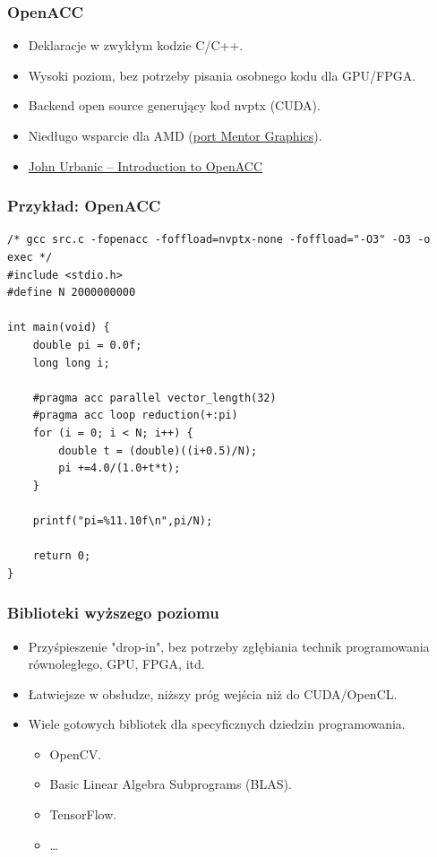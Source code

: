\documentclass[dvipsnames,table]{beamer}
\begin{document}
\begin{frame}
	\frametitle{OpenACC}
\begin{itemize}
	\item Deklaracje w zwykłym kodzie C/C++.
	\item Wysoki poziom, bez potrzeby pisania osobnego kodu dla GPU/FPGA.
	\item Backend open source generujący kod nvptx (CUDA).
	\item Niedługo wsparcie dla AMD (\href{https://gcc.gnu.org/ml/gcc/2018-05/msg00071.html}{port Mentor Graphics}).
	\item \href{https://www.psc.edu/images/xsedetraining/OpenACC_Mar2016/OpenACC_Introduction_To_OpenACC.PDF}{John Urbanic -- Introduction to OpenACC}
\end{itemize}
\end{frame}



\begin{frame}[fragile]
	\frametitle{Przykład: OpenACC}
\begin{lstlisting}
/* gcc src.c -fopenacc -foffload=nvptx-none -foffload="-O3" -O3 -o exec */
#include <stdio.h>
#define N 2000000000

int main(void) {
	double pi = 0.0f;
	long long i;

	#pragma acc parallel vector_length(32)
	#pragma acc loop reduction(+:pi)
	for (i = 0; i < N; i++) {
		double t = (double)((i+0.5)/N);
		pi +=4.0/(1.0+t*t);
	}

	printf("pi=%11.10f\n",pi/N);

	return 0;
}
\end{lstlisting}
\end{frame}

\begin{frame}
	\frametitle{Biblioteki wyższego poziomu}
\begin{itemize}
	\item Przyśpieszenie "drop-in", bez potrzeby zgłębiania technik programowania równoległego, GPU, FPGA, itd.
	\item Łatwiejsze w obsłudze, niższy próg wejścia niż do CUDA/OpenCL.
	\item Wiele gotowych bibliotek dla specyficznych dziedzin programowania.
	\begin{itemize}
		\item OpenCV.
		\item Basic Linear Algebra Subprograms (BLAS).
		\item TensorFlow.
		\item \ldots 
	\end{itemize}
\end{itemize}
\end{frame}
\end{document}
